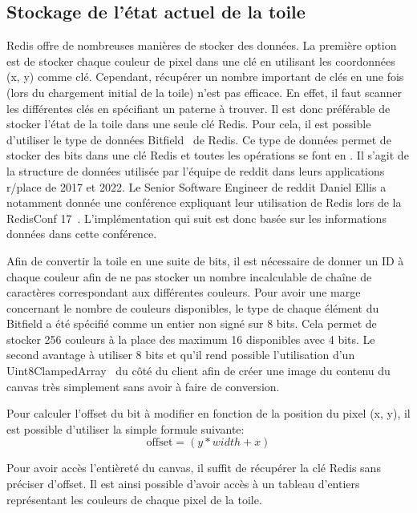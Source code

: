 \subsection{Stockage de l'état actuel de la toile}
\label{section:stockage}

Redis offre de nombreuses manières de stocker des données. La première option est de stocker chaque couleur de pixel dans une clé en utilisant les coordonnées (x, y) comme clé. Cependant, récupérer un nombre important de clés en une fois (lors du chargement initial de la toile) n'est pas efficace. En effet, il faut scanner les différentes clés en spécifiant un paterne à trouver. Il est donc préférable de stocker l'état de la toile dans une seule clé Redis. Pour cela, il est possible d'utiliser le type de données Bitfield~\cite{bitfield} de Redis. Ce type de données permet de stocker des bits dans une clé Redis et toutes les opérations se font en . Il s'agit de la structure de données utilisée par l'équipe de \gls{reddit} dans leurs applications r/place de 2017 et 2022. Le Senior Software Engineer de \gls{reddit} Daniel Ellis a notamment donnée une conférence expliquant leur utilisation de Redis lors de la RedisConf 17~\cite{redisconf}. L'implémentation qui suit est donc basée sur les informations données dans cette conférence.

Afin de convertir la toile en une suite de bits, il est nécessaire de donner un ID à chaque couleur afin de ne pas stocker un nombre incalculable de chaîne de caractères correspondant aux différentes couleurs. Pour avoir une marge concernant le nombre de couleurs disponibles, le type de chaque élément du Bitfield a été spécifié comme un entier non signé sur 8 bits. Cela permet de stocker 256 couleurs à la place des maximum 16 disponibles avec 4 bits. Le second avantage à utiliser 8 bits et qu'il rend possible l'utilisation d'un Uint8ClampedArray~\cite{uint8clampedarray} du côté du client afin de créer une image du contenu du canvas très simplement sans avoir à faire de conversion.

Pour calculer l'offset du bit à modifier en fonction de la position du pixel (x, y), il est possible d'utiliser la simple formule suivante:
\begin{equation}
  \mathrm{offset} = (y * width + x)
\end{equation}

Pour avoir accès l'entièreté du canvas, il suffit de récupérer la clé Redis sans préciser d'offset. Il est ainsi possible d'avoir accès à un tableau d'entiers représentant les couleurs de chaque pixel de la toile.

